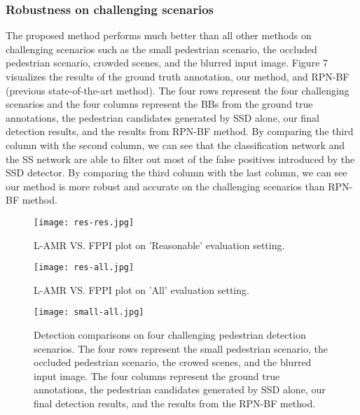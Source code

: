 \documentclass[10pt,letterpaper]{article}
\begin{document}
\subsubsection{Robustness on challenging scenarios}
The proposed method performs much better than all other methods on challenging scenarios such as the small pedestrian scenario, the occluded pedestrian scenario, crowded scenes, and the blurred input image. Figure 7 visualizes the results of the ground truth annotation, our method, and RPN-BF (previous state-of-the-art method). The four rows represent the four challenging scenarios and the four columns represent the BBs from the ground true annotations, the pedestrian candidates generated by SSD alone, our final detection results, and the results from RPN-BF method. By comparing the third column with the second column, we can see that the classification network and the SS network are able to filter out most of the false positives introduced by the SSD detector. By comparing the third column with the last column, we can see our method is more robust and accurate on the challenging scenarios than RPN-BF method.

\begin{figure}
\begin{center}
   \texttt{[image: res-res.jpg]}
\end{center}
   \caption{L-AMR VS. FPPI plot on 'Reasonable' evaluation setting.}
\label{fig:short}
\end{figure}

\begin{figure}
\begin{center}
   \texttt{[image: res-all.jpg]}
\end{center}
   \caption{L-AMR VS. FPPI plot on 'All' evaluation setting.}
\label{fig:short}
\end{figure}

\begin{figure*}
\begin{center}
\texttt{[image: small-all.jpg]}
\end{center}
\caption{Detection comparisons on four challenging pedestrian detection scenarios. The four rows represent the small pedestrian scenario, the occluded pedestrian scenario, the crowed scenes, and the blurred input image. The four columns represent the ground true annotations, the pedestrian candidates generated by SSD alone, our final detection results, and the results from the RPN-BF method.}
\label{fig:fig}
\end{figure*}
\end{document}
